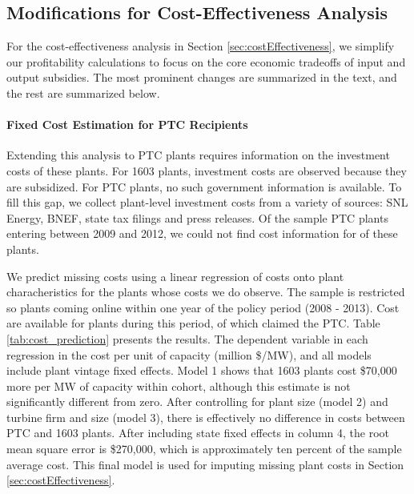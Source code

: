 \documentclass[12pt]{article}
\begin{document}
\subsection{Modifications for Cost-Effectiveness Analysis\label{Appendix:CostEffectiveness-calculation-detail}}

For the cost-effectiveness analysis in Section \ref{sec:costEffectiveness}, we simplify our profitability calculations to focus on the core economic tradeoffs of input and output subsidies. The most prominent changes are summarized in the text, and the rest are summarized below.

\paragraph*{Fixed Cost Estimation for PTC Recipients}
Extending this analysis to PTC plants requires information on the investment costs of these plants. For 1603 plants, investment costs are observed because they are subsidized. For PTC plants, no such government information is available. To fill this gap, we collect plant-level investment costs from a variety of sources: SNL Energy, BNEF, state tax filings and press releases. Of the  \unskip sample PTC plants entering between 2009 and 2012, we could not find cost information for  \unskip of these plants. 

We predict missing costs using a linear regression of costs onto plant characheristics for the plants whose costs we do observe. The sample is restricted so plants coming online within one year of the policy period (2008 - 2013). Cost are available for  \unskip  plants during this period,  \unskip of which claimed the PTC. Table \ref{tab:cost_prediction} presents the results. The dependent variable in each regression in the cost per unit of capacity (million \$/MW), and all models include plant vintage fixed effects. Model 1 shows that 1603 plants cost \$70,000 more per MW of capacity within cohort, although this estimate is not significantly different from zero. After controlling for plant size (model 2) and turbine firm and size (model 3), there is effectively no difference in costs between PTC and 1603 plants. After including state fixed effects in column 4, the root mean square error is \$270,000, which is approximately ten percent of the sample average cost. This final model is used for imputing missing plant costs in Section \ref{sec:costEffectiveness}.
\end{document}
